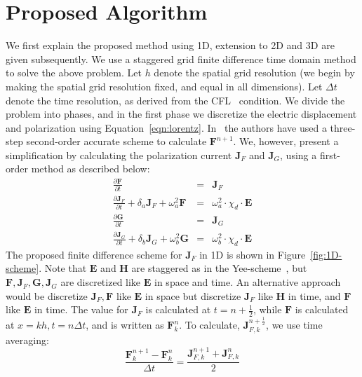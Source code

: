 \documentclass{article}[12pt]
\theoremstyle{plain}
\begin{document}
\section{Proposed Algorithm}
\label{section:proposed_algorithm}
We first explain the proposed method using 1D, extension to 2D and 3D are given subsequently.
We use a staggered grid finite difference time domain method to solve the above problem.
Let $h$ denote the spatial grid resolution (we begin by making the spatial grid resolution fixed, and
equal in all dimensions). Let $\Delta t$ denote the time resolution, as derived from the CFL~\cite{taflove2005computational} condition. We divide the problem into phases, and in the first phase we discretize the electric
displacement and polarization using Equation~\ref{eqn:lorentz}. In~\cite{bourgeade_and_nkonga_siam_2005}
the authors have used a three-step second-order accurate scheme to calculate $\mathbf{F}^{n+1}$.
We, however, present a simplification by calculating the polarization current $\mathbf{J}_F$
and $\mathbf{J}_G$, using a first-order method as described below:
\begin{eqnarray}
\frac{\partial \mathbf{F}}{\partial t} & = & \mathbf{J}_F \label{eqn:lorentz-first-order-begin} \\
\frac{\partial \mathbf{J}_F}{\partial t} + \delta_a \mathbf{J}_F + \omega^2_a \mathbf{F}& = & \omega^2_a \cdot \chi_d \cdot \mathbf{E}  \\
\frac{\partial \mathbf{G}}{\partial t} & = & \mathbf{J}_G  \\
\frac{\partial \mathbf{J}_G}{\partial t} + \delta_b \mathbf{J}_G + \omega^2_b \mathbf{G} & = & \omega^2_b \cdot \chi_d \cdot \mathbf{E} \label{eqn:lorentz-first-order-end}
\end{eqnarray}
The proposed finite difference scheme for $\mathbf{J}_F$ in 1D is shown in Figure~\ref{fig:1D-scheme}.
Note that $\mathbf{E}$ and $\mathbf{H}$ are staggered as in the Yee-scheme~\cite{taflove2005computational}, but
$\mathbf{F},\mathbf{J}_F,\mathbf{G},\mathbf{J}_G$ are discretized like $\mathbf{E}$ in space and time.
An alternative approach would be discretize $\mathbf{J}_F,\mathbf{F}$ like $\mathbf{E}$ in space
but discretize $\mathbf{J}_F$ like $\mathbf{H}$ in time, and $\mathbf{F}$ like $\mathbf{E}$ in time.
The value for $\mathbf{J}_F$ is calculated at $t=n+\frac{1}{2}$, while $\mathbf{F}$ is calculated at
$x=kh,t=n\Delta t$, and is written as $\mathbf{F}_{k}^n$. To calculate, $\mathbf{J}_{F,k}^{n+\frac{1}{2}}$, we
use time averaging:
\begin{equation}
\frac{ \mathbf{F}^{n+1}_k - \mathbf{F}^n_k}{\Delta t} = \frac{\mathbf{J}_{F,k}^{n+1}+\mathbf{J}_{F,k}^n}{2}
\end{equation}
\end{document}
